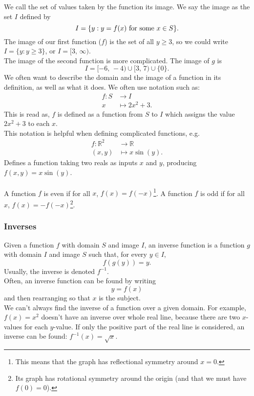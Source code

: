 \documentclass[10pt, a4paper]{article}
\newcommand{\R}{\mathbb{R}}
\begin{document}
We call the set of values taken by the function its image. We say the image as the set $I$ defined by
\[
I = \{y : y = f(x) \textnormal{ for some } x \in S\}.
\]
The image of our first function ($f$) is the set of all $y \geq 3$, so we could write $I = \{y : y \geq 3\}$, or $I = [3,\,\infty)$. \\
The image of the second function is more complicated. The image of $g$ is
\[
I = [-6,\,-4) \cup [3,\,7) \cup \{0\}.
\]
We often want to describe the domain and the image of a function in its definition, as well as what it does. We often use notation such as:
\begin{align*}
f : S &\rightarrow I \\
x &\mapsto 2x ^ 2 + 3.
\end{align*}
This is read as, $f$ is defined as a function from $S$ to $I$ which assigns the value $2x ^ 2 + 3$ to each $x$. \\
This notation is helpful when defining complicated functions, e.g.
\begin{align*}
f : \R ^ 2 &\rightarrow \R \\
(x, y) &\mapsto x\sin{(y)}.
\end{align*}
Defines a function taking two reals as inputs $x$ and $y$, producing $f(x, y) = x\sin{(y)}$. \\
\\
A function $f$ is even if for all $x$, $f(x) = f(-x)$\footnote{This means that the graph has reflectional symmetry around $x = 0$.}. A function $f$ is odd if for all $x$, $f(x) = -f(-x)$\footnote{Its graph has rotational symmetry around the origin (and that we must have $f(0) = 0$).}.


\subsubsection{Inverses}
Given a function $f$ with domain $S$ and image $I$, an inverse function is a function $g$ with domain $I$ and image $S$ such that, for every $y \in I$,
\[
f(g(y)) = y.
\]
Usually, the inverse is denoted $f ^ {-1}$. \\
Often, an inverse function can be found by writing
\[
y = f(x)
\]
and then rearranging so that $x$ is the subject. \\
We can't always find the inverse of a function over a given domain. For example, $f(x) = x ^ 2$ doesn't have an inverse over whole real line, because there are two $x$-values for each $y$-value. If only the positive part of the real line is considered, an inverse can be found: $f ^ {-1}(x) = \sqrt{x}$.
\end{document}
